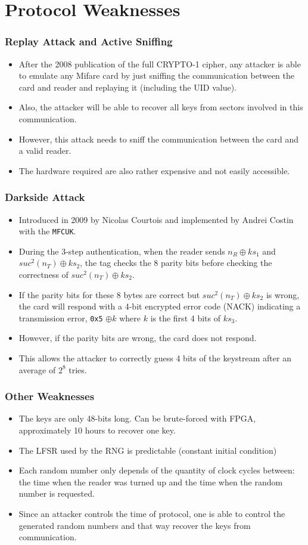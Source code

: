 \documentclass[12pt]{beamer}
\begin{document}
\section{Protocol Weaknesses}
\begin{frame}
\frametitle{Replay Attack and Active Sniffing}
\begin{itemize}
	\item After the 2008 publication of the full CRYPTO-1 cipher, any attacker is able to emulate any Mifare card by just sniffing the communication between the card and reader and replaying it (including the UID value).
	\item Also, the attacker will be able to recover all keys from sectors involved in this communication.
	\item However, this attack needs to sniff the communication between the card and a valid reader.
	\item The hardware required are also rather expensive and not easily accessible.
\end{itemize}
\end{frame}

\begin{frame}
\frametitle{Darkside Attack}
\begin{itemize}
	\item Introduced in 2009 by Nicolas Courtois and implemented by Andrei Costin with the \texttt{MFCUK}.
	\item During the 3-step authentication, when the reader sends $n_R\oplus ks_1$ and $suc^2(n_T)\oplus ks_2$, the tag checks the 8 parity bits before checking the correctness of $suc^2(n_T)\oplus ks_2$.
	\item If the parity bits for these 8 bytes are correct but $suc^2(n_T)\oplus ks_2$ is wrong, the card will respond with a 4-bit encrypted error code  (NACK) indicating a transmission error,  \texttt{0x5} $\oplus k$ where $k$ is the first 4 bits of $ks_3$.
	\item However, if the parity bits are wrong, the card does not respond.
	\item This allows the attacker to correctly guess 4 bits of the keystream after an average of $2^8$ tries.
\end{itemize}
\end{frame}

\begin{frame}
\frametitle{Other Weaknesses}
\begin{itemize}
	\item The keys are only 48-bits long. Can be brute-forced with FPGA, approximately 10 hours to recover one key.
	\item The LFSR used by the RNG is predictable (constant initial condition)
	\item Each random number only depends of the quantity of clock cycles between: the time when the reader was turned up and the time when the random number is requested.
	\item Since an attacker controls the time of protocol, one is able to control the generated random numbers and that way recover the keys from communication.
\end{itemize}
\end{frame}
\end{document}

